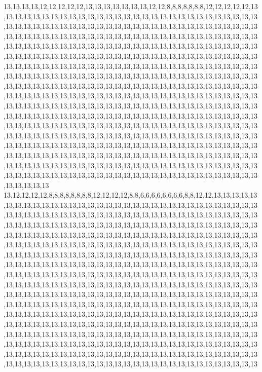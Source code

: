 13,13,13,13,12,12,12,12,12,13,13,13,13,13,13,13,12,12,8,8,8,8,8,8,8,12,12,12,12,12,13,13,13,13,13,13,13,13,13,13,13,13,13,13,13,13,13,13,13,13,13,13,13,13,13,13,13,13,13,13,13,13,13,13,13,13,13,13,13,13,13,13,13,13,13,13,13,13,13,13,13,13,13,13,13,13,13,13,13,13,13,13,13,13,13,13,13,13,13,13,13,13,13,13,13,13,13,13,13,13,13,13,13,13,13,13,13,13,13,13,13,13,13,13,13,13,13,13,13,13,13,13,13,13,13,13,13,13,13,13,13,13,13,13,13,13,13,13,13,13,13,13,13,13,13,13,13,13,13,13,13,13,13,13,13,13,13,13,13,13,13,13,13,13,13,13,13,13,13,13,13,13,13,13,13,13,13,13,13,13,13,13,13,13,13,13,13,13,13,13,13,13,13,13,13,13,13,13,13,13,13,13,13,13,13,13,13,13,13,13,13,13,13,13,13,13,13,13,13,13,13,13,13,13,13,13,13,13,13,13,13,13,13,13,13,13,13,13,13,13,13,13,13,13,13,13,13,13,13,13,13,13,13,13,13,13,13,13,13,13,13,13,13,13,13,13,13,13,13,13,13,13,13,13,13,13,13,13,13,13,13,13,13,13,13,13,13,13,13,13,13,13,13,13,13,13,13,13,13,13,13,13,13,13,13,13,13,13,13,13,13,13,13,13,13,13,13,13,13,13,13,13,13,13,13,13,13,13,13,13,13,13,13,13,13,13,13,13,13,13,13,13,13,13,13,13,13,13,13,13,13,13,13,13,13,13,13,13,13,13,13,13,13,13,13,13,13,13,13,13,13,13,13,13,13,13,13,13,13,13,13,13,13,13,13,13,13,13,13,13,13,13,13,13,13,13,13,13,13,13,13,13,13,13,13,13,13,13,13,13,13,13,13,13,13,13,13,13,13,13,13,13,13,13,13,13,13,13,13,13,13,13,13,13,13,13,13,13,13,13,13,13,13,13,13,13,13,13,13,13,13,13,13,13,13,13,13,13,13,13,13,13,13,13,13,13,13,13,13,13,13,13,13,13,13,13,13,13,13,13,13,13,13,13,13,13,13,13,13,13,13,13,13,13,13,13,13,13,13,13,13,13
13,12,12,12,12,8,8,8,8,8,8,8,8,12,12,12,12,8,8,6,6,6,6,6,6,6,6,8,8,12,12,13,13,13,13,13,13,13,13,13,13,13,13,13,13,13,13,13,13,13,13,13,13,13,13,13,13,13,13,13,13,13,13,13,13,13,13,13,13,13,13,13,13,13,13,13,13,13,13,13,13,13,13,13,13,13,13,13,13,13,13,13,13,13,13,13,13,13,13,13,13,13,13,13,13,13,13,13,13,13,13,13,13,13,13,13,13,13,13,13,13,13,13,13,13,13,13,13,13,13,13,13,13,13,13,13,13,13,13,13,13,13,13,13,13,13,13,13,13,13,13,13,13,13,13,13,13,13,13,13,13,13,13,13,13,13,13,13,13,13,13,13,13,13,13,13,13,13,13,13,13,13,13,13,13,13,13,13,13,13,13,13,13,13,13,13,13,13,13,13,13,13,13,13,13,13,13,13,13,13,13,13,13,13,13,13,13,13,13,13,13,13,13,13,13,13,13,13,13,13,13,13,13,13,13,13,13,13,13,13,13,13,13,13,13,13,13,13,13,13,13,13,13,13,13,13,13,13,13,13,13,13,13,13,13,13,13,13,13,13,13,13,13,13,13,13,13,13,13,13,13,13,13,13,13,13,13,13,13,13,13,13,13,13,13,13,13,13,13,13,13,13,13,13,13,13,13,13,13,13,13,13,13,13,13,13,13,13,13,13,13,13,13,13,13,13,13,13,13,13,13,13,13,13,13,13,13,13,13,13,13,13,13,13,13,13,13,13,13,13,13,13,13,13,13,13,13,13,13,13,13,13,13,13,13,13,13,13,13,13,13,13,13,13,13,13,13,13,13,13,13,13,13,13,13,13,13,13,13,13,13,13,13,13,13,13,13,13,13,13,13,13,13,13,13,13,13,13,13,13,13,13,13,13,13,13,13,13,13,13,13,13,13,13,13,13,13,13,13,13,13,13,13,13,13,13,13,13,13,13,13,13,13,13,13,13,13,13,13,13,13,13,13,13,13,13,13,13,13,13,13,13,13,13,13,13,13,13,13,13,13,13,13,13,13,13,13,13,13,13,13,13,13,13,13,13,13,13,13,13,13,13,13,13,13,13,13,13,13,13,13,13,13,13,13,13,13,13,13,13,13,13

